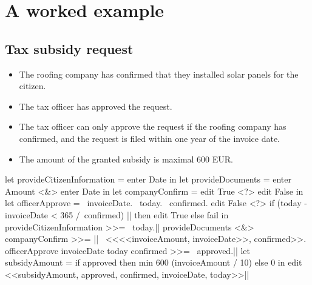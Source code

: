 
\section{A worked example}
\label{sec:examples}

\subsection{Tax subsidy request}

%
\begin{itemize}
\item The roofing company has confirmed that they installed solar panels for the citizen.
\item The tax officer has approved the request.
\item The tax officer can only approve the request if the roofing company has confirmed, and the request is filed within one year of the invoice date.
\item The amount of the granted subsidy is maximal 600 EUR.
\end{itemize}

\begin{TASK}[float=ht
            ,numbers=right
            ,caption=Subsidy request and approval workflow at the Dutch tax office.
            ,label=lst:tax
            ]
  let provideCitizenInformation = enter Date in
  let provideDocuments = enter Amount <&> enter Date in
  let companyConfirm = edit True <?> edit False in
  let officerApprove = \ invoiceDate. \ today. \ confirmed.
    edit False <?> if (today - invoiceDate < 365 /\ confirmed) |\label{lst:tax:officer-approve-def}|
      then edit True
      else fail in
  provideCitizenInformation >>= \ today.|\label{lst:tax:citizen-info}|
  provideDocuments <&> companyConfirm >>= |\label{lst:tax:documents-and-company-confirm}|
    \ <<<<invoiceAmount, invoiceDate>>, confirmed>>.
  officerApprove invoiceDate today confirmed >>= \ approved.|\label{lst:tax:officer-approve}|
  let subsidyAmount = if approved
    then min 600 (invoiceAmount / 10) else 0 in
  edit <<subsidyAmount, approved, confirmed, invoiceDate, today>>|\label{lst:tax:result}|
\end{TASK}

